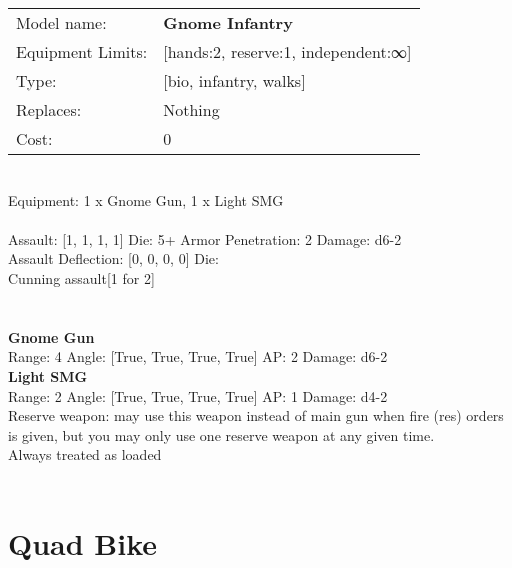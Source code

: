\noindent
\begin{tabular}{ll}
Model name: &{\bf Gnome Infantry } \\
Equipment Limits: &[hands:2, reserve:1, independent:∞] \\
Type: &[bio, infantry, walks] \\
Replaces: &Nothing \\
Cost: & 0\\
\end{tabular}
\ \\
Equipment: 1 x Gnome Gun, 1 x Light SMG \\
\ \\
Assault: [1, 1, 1, 1] Die: 5+ Armor Penetration: 2 Damage: d6-2 \\
Assault Deflection: [0, 0, 0, 0] Die: \\
\indent Cunning assault[1 for 2]\\ 
 
\ \\

\ \\
{\bf Gnome Gun } \\



Range: 4  Angle: [True, True, True, True] AP: 2 Damage: d6-2 \\




{\bf Light SMG } \\



Range: 2  Angle: [True, True, True, True] AP: 1 Damage: d4-2 \\
Reserve weapon: may use this weapon instead of main gun when fire (res) orders is given, but you may only use one reserve weapon at any given time.\\ 
Always treated as loaded\\ 




 
\ \\













\clearpage

\section{ Quad Bike }

